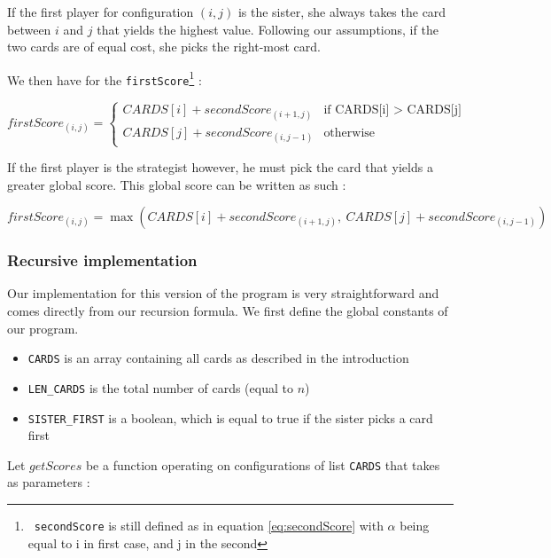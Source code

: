 \documentclass[a4paper,12pt,fleqn]{article}
\newcommand\ezskip{\medskip\noindent}
\begin{document}
If the first player for configuration $(i,j)$ is the sister, she always takes the card between $i$ and $j$ that yields the highest value.
Following our assumptions, if the two cards are of equal cost, she picks the right-most card.

We then have for the \texttt{firstScore}\footnote{\ \texttt{secondScore} is still defined as in equation \ref{eq:secondScore} with $\alpha$ being equal to i in first case, and j in the second} :

    \begin{equation}
    firstScore_{(i,j)} =    \begin{cases}
                                CARDS[i] + secondScore_{(i+1,j)} & \text{if CARDS[i] > CARDS[j]} \\
                                CARDS[j] + secondScore_{(i,j-1)} & \text{otherwise}
                            \end{cases}
    \end{equation}
    
If the first player is the strategist however, he must pick the card that yields a greater global score.
This global score can be written as such :

    \begin{equation}
    firstScore_{(i,j)} = \max \left(CARDS[i] + secondScore_{(i+1,j)}, \ 
                                    CARDS[j] + secondScore_{(i,j-1)}\right)
    \end{equation}

\subsubsection{Recursive implementation}

Our implementation for this version of the program is very straightforward and comes directly from our recursion formula. We first define the global constants of our program.

\begin{itemize}
    \item \texttt{CARDS} is an array containing all cards as described in the introduction
    \item \texttt{LEN\_CARDS} is the total number of cards (equal to $n$)
    \item \texttt{SISTER\_FIRST} is a boolean, which is equal to true if the sister picks a card first
\end{itemize}

\ezskip Let $getScores$ be a function operating on configurations of list \texttt{CARDS} that takes as parameters :
\end{document}
